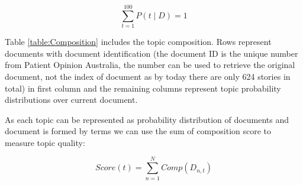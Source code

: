 \documentclass[11pt,twoside]{report}
\begin{document}
\begin{equation}
\sum_{t=1}^100 P(t\mid D) = 1
\end{equation}

Table \ref{table:Composition} includes the topic composition. Rows represent documents with document identification (the document ID is the unique number from Patient Opinion Australia, the number can be used to retrieve the original document, not the index of document as by today there are only 624 stories in total) in first column and the remaining columns represent topic probability distributions over current document. 

As each topic can be represented as probability distribution of documents and document is formed by terms we can use the sum of composition score to measure topic quality:

\begin{equation}
Score(t) = \sum_{n=1}^N Comp(D_{n,t})
\end{equation}
\end{document}
